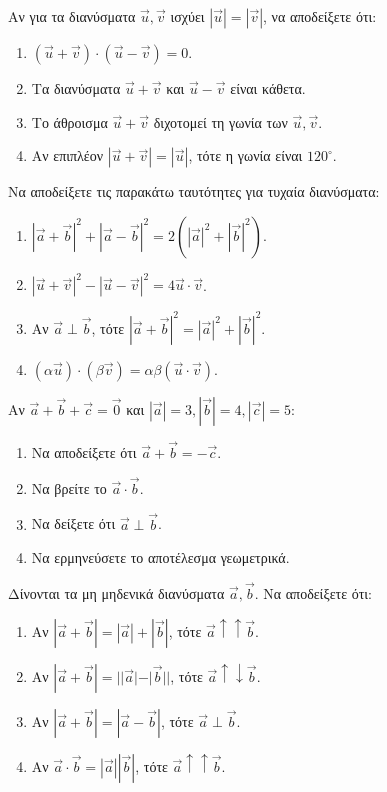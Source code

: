 \documentclass[11pt,a4paper,modern]{FFExercises}
\begin{document}
\askhsh
Αν για τα διανύσματα $\vec{u}, \vec{v}$ ισχύει $|\vec{u}|=|\vec{v}|$, να αποδείξετε ότι:
\begin{enumerate}
    \item $(\vec{u}+\vec{v})\cdot(\vec{u}-\vec{v}) = 0$.
    \item Τα διανύσματα $\vec{u}+\vec{v}$ και $\vec{u}-\vec{v}$ είναι κάθετα.
    \item Το άθροισμα $\vec{u}+\vec{v}$ διχοτομεί τη γωνία των $\vec{u}, \vec{v}$.
    \item Αν επιπλέον $|\vec{u}+\vec{v}|=|\vec{u}|$, τότε η γωνία είναι $120^\circ$.
\end{enumerate}

\askhsh
Να αποδείξετε τις παρακάτω ταυτότητες για τυχαία διανύσματα:
\begin{enumerate}
    \item $|\vec{a}+\vec{b}|^2 + |\vec{a}-\vec{b}|^2 = 2(|\vec{a}|^2 + |\vec{b}|^2)$.
    \item $|\vec{u}+\vec{v}|^2 - |\vec{u}-\vec{v}|^2 = 4\vec{u}\cdot\vec{v}$.
    \item Αν $\vec{a} \perp \vec{b}$, τότε $|\vec{a}+\vec{b}|^2 = |\vec{a}|^2 + |\vec{b}|^2$.
    \item $ (\alpha \vec{u}) \cdot (\beta \vec{v}) = \alpha \beta (\vec{u} \cdot \vec{v}) $.
\end{enumerate}

\askhsh
Αν $\vec{a} + \vec{b} + \vec{c} = \vec{0}$ και $|\vec{a}|=3, |\vec{b}|=4, |\vec{c}|=5$:
\begin{enumerate}
    \item Να αποδείξετε ότι $\vec{a}+\vec{b} = -\vec{c}$.
    \item Να βρείτε το $\vec{a}\cdot\vec{b}$.
    \item Να δείξετε ότι $\vec{a} \perp \vec{b}$.
    \item Να ερμηνεύσετε το αποτέλεσμα γεωμετρικά.
\end{enumerate}

\askhsh
Δίνονται τα μη μηδενικά διανύσματα $\vec{a}, \vec{b}$. Να αποδείξετε ότι:
\begin{enumerate}
    \item Αν $|\vec{a}+\vec{b}| = |\vec{a}| + |\vec{b}|$, τότε $\vec{a} \uparrow\uparrow \vec{b}$.
    \item Αν $|\vec{a}+\vec{b}| = ||\vec{a}| - |\vec{b}||$, τότε $\vec{a} \uparrow\downarrow \vec{b}$.
    \item Αν $|\vec{a}+\vec{b}| = |\vec{a}-\vec{b}|$, τότε $\vec{a} \perp \vec{b}$.
    \item Αν $\vec{a}\cdot\vec{b} = |\vec{a}||\vec{b}|$, τότε $\vec{a} \uparrow\uparrow \vec{b}$.
\end{enumerate}
\end{document}
